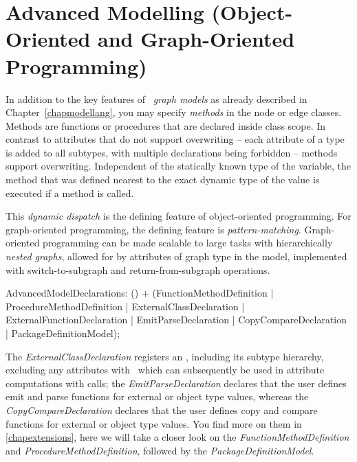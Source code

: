 \chapter{Advanced Modelling (Object-Oriented and Graph-Oriented Programming)}
\label{cha:modeladvanced}

In addition to the key features of \GrG\ \emph{graph models} as already described in Chapter~\ref{chapmodellang}, you may specify \emph{methods} in the node or edge classes.
Methods are functions or procedures that are declared inside class scope.
In contrast to attributes that do not support overwriting -- each attribute of a type is added to all subtypes, with multiple declarations being forbidden -- methods support overwriting.
Independent of the statically known type of the variable, the method that was defined nearest to the exact dynamic type of the value is executed if a method is called.

This \emph{dynamic dispatch} is the defining feature of object-oriented programming.
For graph-oriented programming, the defining feature is \emph{pattern-matching}.
Graph-oriented programming can be made scalable to large tasks with hierarchically \emph{nested graphs}, allowed for by attributes of graph type in the model, implemented with switch-to-subgraph and return-from-subgraph operations.

\begin{rail}
  AdvancedModelDeclarations: () + (FunctionMethodDefinition
										 | ProcedureMethodDefinition
  									 | ExternalClassDeclaration
  									 | ExternalFunctionDeclaration
  									 | EmitParseDeclaration
  									 | CopyCompareDeclaration
										 | PackageDefinitionModel);
\end{rail}

The \emph{ExternalClassDeclaration} registers an , including its subtype hierarchy, excluding any attributes with \GrG~which can subsequently be used in attribute computations with  calls; the \emph{EmitParseDeclaration} declares that the user defines emit and parse functions for external or object type values, whereas the \emph{CopyCompareDeclaration} declares that the user defines copy and compare functions for external or object type values.
You find more on them in \ref{chapextensions}, here we will take a closer look on the \emph{FunctionMethodDefinition} and \emph{ProcedureMethodDefinition}, followed by the \emph{PackageDefinitionModel}.

